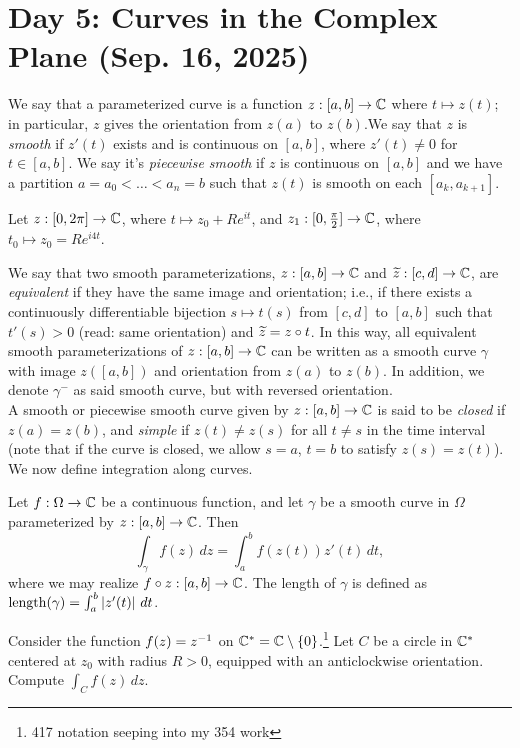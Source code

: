 \section{Day 5: Curves in the Complex Plane (Sep. 16, 2025)}
We say that a parameterized curve is a function $z : [a, b] \to \mathbb C$ where $t \mapsto z(t)$; in particular, $z$ gives the orientation from $z(a)$ to $z(b)$.We say that $z$ is \textit{smooth} if $z'(t)$ exists and is continuous on $[a, b]$, where $z'(t) \neq 0$ for $t \in [a, b]$. We say it's \textit{piecewise smooth} if $z$ is continuous on $[a, b]$ and we have a partition $a = a_0 < \dots < a_n = b$ such that $z(t)$ is smooth on each $[a_k, a_{k+1}]$.
\begin{example}
    Let $z : [0, 2\pi] \to \mathbb C$, where $t \mapsto z_0 + Re^{it}$, and $z_1 : [0, \frac{\pi}{2}] \to \mathbb C$, where $t_0 \mapsto z_0 = Re^{i4t}$.
\end{example}
\noindent We say that two smooth parameterizations, $z : [a, b] \to \mathbb C$ and $\widetilde z : [c, d] \to \mathbb C$, are \textit{equivalent} if they have the same image and orientation; i.e., if there exists a continuously differentiable bijection $s \mapsto t(s)$ from $[c, d]$ to $[a, b]$ such that $t'(s) > 0$ (read: same orientation) and $\widetilde z = z \circ t$. In this way, all equivalent smooth parameterizations of $z : [a, b] \to \mathbb C$ can be written as a smooth curve $\gamma$ with image $z([a, b])$ and orientation from $z(a)$ to $z(b)$. In addition, we denote $\gamma^-$ as said smooth curve, but with reversed orientation.
\\[8pt]
A smooth or piecewise smooth curve given by $z : [a, b] \to \mathbb C$ is said to be \textit{closed} if $z(a) = z(b)$, and \textit{simple} if $z(t) \neq z(s)$ for all $t \neq s$ in the time interval (note that if the curve is closed, we allow $s = a$, $t = b$ to satisfy $z(s) = z(t)$). We now define integration along curves.
\begin{definition}
    Let $f : \Omega \to \mathbb C$ be a continuous function, and let $\gamma$ be a smooth curve in $\Omega$ parameterized by $z : [a, b] \to \mathbb C$. Then
    \[ \int_\gamma f(z) \, dz = \int_a^b f(z(t)) z'(t) \, dt, \]
    where we may realize $f \circ z : [a, b] \to \mathbb C$. The length of $\gamma$ is defined as $\operatorname{length}(\gamma) = \int_a^b \left\lvert z'(t) \right\rvert \, dt$.
\end{definition}
\begin{example}
    Consider the function $f(z) = z^{-1}$ on $\mathbb C^\ast = \mathbb C \setminus \{0\}$.\footnote{417 notation seeping into my 354 work} Let $C$ be a circle in $\mathbb C^\ast$ centered at $z_0$ with radius $R > 0$, equipped with an anticlockwise orientation. Compute $\int_C f(z) \, dz$.
\end{example}
